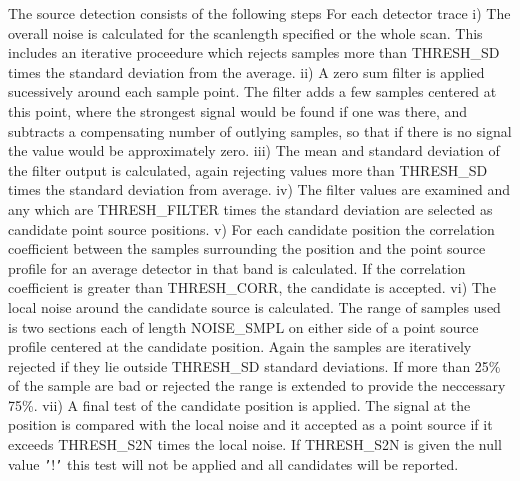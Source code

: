 \documentclass[11pt,nolof,noabs]{starlink}
\begin{document}
\begin{small}
{{      The source detection consists of the following steps
      For each detector trace
      i)   The overall noise is calculated for the scanlength specified
           or the whole scan. This includes an iterative proceedure
           which rejects samples more than THRESH\_SD times the standard
           deviation from the average.
      ii)  A zero sum filter is applied sucessively around each sample
           point. The filter adds a few samples centered at this point, where
           the strongest signal would be found if one was there, and subtracts
           a compensating number of outlying samples, so that if there is
           no signal the value would be approximately zero.
      iii) The mean and standard deviation of the filter output is calculated,
           again rejecting values more than THRESH\_SD times the standard
           deviation from average.
      iv)  The filter values are examined and any which are THRESH\_FILTER
           times the standard deviation are selected as candidate point
           source positions.
      v)   For each candidate position the correlation coefficient between
           the samples surrounding the position and the point source profile
           for an average detector in that band is calculated. If the
           correlation coefficient is greater than THRESH\_CORR, the candidate
           is accepted.
      vi)  The local noise around the candidate source is calculated. The
           range of samples used is two sections each of length NOISE\_SMPL
           on either side of a point source profile centered at the
           candidate position. Again the samples are iteratively rejected if
           they lie outside THRESH\_SD standard deviations. If more than 25\%
           of the sample are bad or rejected the range is extended to provide
           the neccessary 75\%.
      vii) A final test of the candidate position is applied. The signal at
           the position is compared with the local noise and it accepted as
           a point source if it exceeds THRESH\_S2N times the local noise.
           If THRESH\_S2N is given the null value \texttt{'}!\texttt{'} this test will not be
           applied and all candidates will be reported.

}}
\end{small}
\end{document}
